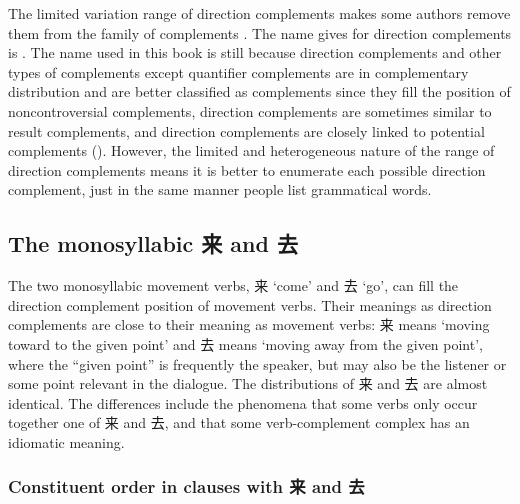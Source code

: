 \documentclass[../main.tex]{subfiles}
\begin{document}
The limited variation range of direction complements makes 
some authors remove them from the family of complements \citep[]{po2015chinese}.
The name \citet{po2015chinese} gives for direction complements is .
The name used in this book is still  because 
direction complements and other types of complements except quantifier complements 
are in complementary distribution and are better classified as complements 
since they fill the position of noncontroversial complements, 
direction complements are sometimes similar to result complements, %
and direction complements are closely linked to potential complements 
().
However, the limited and heterogeneous nature of the range of direction complements 
means it is better to enumerate each possible direction complement, 
just in the same manner people list grammatical words.

\subsection{The monosyllabic 来 and 去}

The two monosyllabic movement verbs, 来 `come' and 去 `go', 
can fill the direction complement position of movement verbs. %
Their meanings as direction complements are close to their meaning as movement verbs:
来 means `moving toward to the given point' and 去 means `moving away from the given point',
where the ``given point'' is frequently the speaker, 
but may also be the listener or some point relevant in the dialogue.
The distributions of 来 and 去 are almost identical. 
The differences include the phenomena that some verbs only occur together one of 来 and 去,
and that some verb-complement complex has an idiomatic meaning.

\subsubsection{Constituent order in clauses with 来 and 去}
\end{document}
